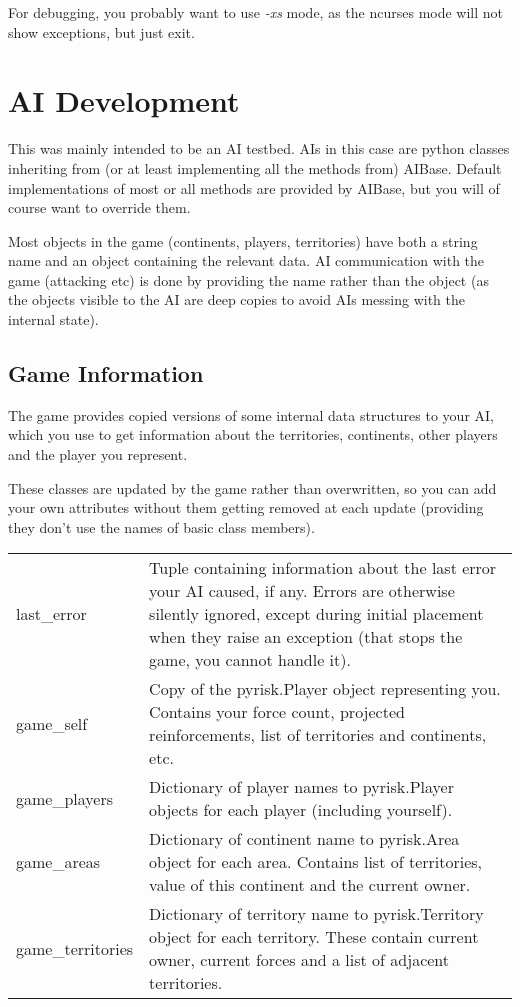 \documentclass[12pt,a4paper]{article}
\begin{document}
For debugging, you probably want to use \textit{-xs} mode, as the ncurses mode will not show exceptions, but just exit.

\section{AI Development}

This was mainly intended to be an AI testbed. AIs in this case are python classes inheriting from (or at least implementing all the methods from) AIBase. Default implementations of most or all methods are provided by AIBase, but you will of course want to override them.

Most objects in the game (continents, players, territories) have both a string name and an object containing the relevant data. AI communication with the game (attacking etc) is done by providing the name rather than the object (as the objects visible to the AI are deep copies to avoid AIs messing with the internal state).

\subsection{Game Information}

The game provides copied versions of some internal data structures to your AI, which you use to get information about the territories, continents, other players and the player you represent.

These classes are updated by the game rather than overwritten, so you can add your own attributes without them getting removed at each update (providing they don't use the names of basic class members).

\begin{tabular}{ll}
last\_error&Tuple containing information about the last error your AI caused, if any. Errors are otherwise silently ignored, except during initial placement when they raise an exception (that stops the game, you cannot handle it).\\
game\_self&Copy of the pyrisk.Player object representing you. Contains your force count, projected reinforcements, list of territories and continents, etc.\\
game\_players&Dictionary of player names to pyrisk.Player objects for each player (including yourself).\\
game\_areas&Dictionary of continent name to pyrisk.Area object for each area. Contains list of territories, value of this continent and the current owner.\\
game\_territories&Dictionary of territory name to pyrisk.Territory object for each territory. These contain current owner, current forces and a list of adjacent territories.\\
\end{tabular}
\end{document}
